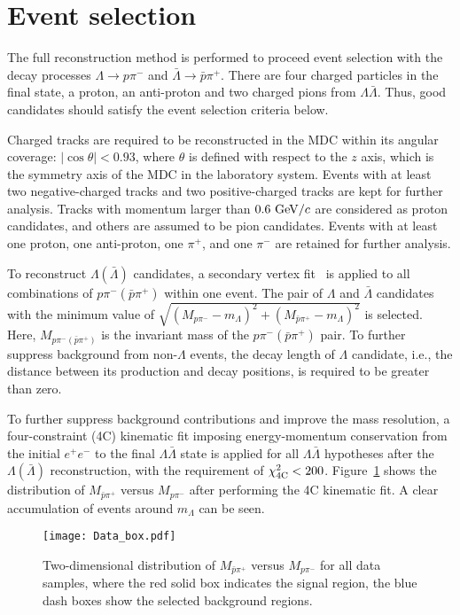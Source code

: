 \documentclass[a4paper,11pt]{article}
\begin{document}
\section{Event selection}
The full reconstruction method is performed to proceed event selection with the decay processes $\Lambda\to p\pi^- $
and $\bar{\Lambda}\to \bar{p}\pi^+$.
There are four charged particles in the final state, {a} proton, {an} anti-proton {and} two charged pions from
$\Lambda\bar{\Lambda}$.  Thus, good candidates should satisfy the event selection criteria below.

Charged tracks are required to be reconstructed in the MDC within its angular coverage: $|\cos\theta|<0.93$, where $\theta$ is defined with respect to the $z$ axis, which is the symmetry axis of the MDC in the laboratory system. Events with at least two negative-charged tracks and two positive-charged tracks are kept for further analysis. 
{Tracks with momentum larger than $0.6~{\rm GeV}/c $ are considered as proton candidates, and others are assumed to be pion candidates.}
Events with at least one proton, one anti-proton, one $\pi^+$, and one $\pi^-$ are retained for further analysis.

To reconstruct $\Lambda(\bar\Lambda)$ candidates, a secondary vertex fit~\cite{XUM} is applied to all combinations of $p\pi^{-}(\bar{p}\pi^{+})$ within one event. The pair of $\Lambda$ and $\bar\Lambda$ candidates  with the minimum value
of $\sqrt{(M_{p\pi^{-}}-m_{\Lambda})^{2} + (M_{\bar{p}\pi^{+}}-m_{\Lambda})^{2}}$ is selected.
Here, $M_{p\pi^{-}(\bar{p}\pi^{+})}$ is the invariant mass of the $p\pi^{-}(\bar{p}\pi^{+})$ pair. 
To further suppress background from non-$\Lambda$ events, the decay length of $\Lambda$ candidate,  i.e., the distance between its production and decay positions, is required to be greater than zero. 

To further  suppress background contributions and improve the mass resolution, a four-constraint (4C) kinematic fit imposing energy-momentum conservation from the initial $e^+e^-$ to the final $\Lambda\bar\Lambda$ state is applied for all $\Lambda\bar\Lambda$ hypotheses after the $\Lambda(\bar\Lambda)$
reconstruction, with the requirement of $\chi^{2}_{\rm 4C} < 200$. Figure~\ref{scatter_plot::llb} shows the distribution of
$M_{\bar{p}\pi^{+}}$ versus $M_{p\pi^{-}}$ after performing the 4C kinematic fit. A clear accumulation of events around $m_{\Lambda}$ can be seen.

\begin{figure}[!htbp]
	\begin{center}
\texttt{[image: Data\_box.pdf]}
	\end{center}
\caption{Two-dimensional distribution of $M_{\bar{p}\pi^{+}}$ versus $M_{p\pi^{-}}$ for all data samples, where the {red solid} box indicates the signal region, the {blue dash} boxes show the selected background regions.
}
\label{scatter_plot::llb}
\end{figure}
\end{document}
